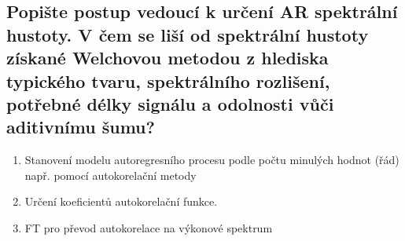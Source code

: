 \documentclass[a4paper,12pt]{article}   %
\begin{document}
\subsection{Popište postup vedoucí k určení AR spektrální hustoty. V čem se liší od spektrální hustoty získané Welchovou metodou z hlediska typického tvaru, spektrálního rozlišení, potřebné délky signálu a odolnosti vůči aditivnímu šumu?}
\begin{enumerate}
        \item Stanovení modelu autoregresního procesu podle počtu minulých hodnot (řád) např. pomocí autokorelační metody
        \item Určení koeficientů autokorelační funkce.
        \item FT pro převod autokorelace na výkonové spektrum
\end{enumerate}
\end{document}

